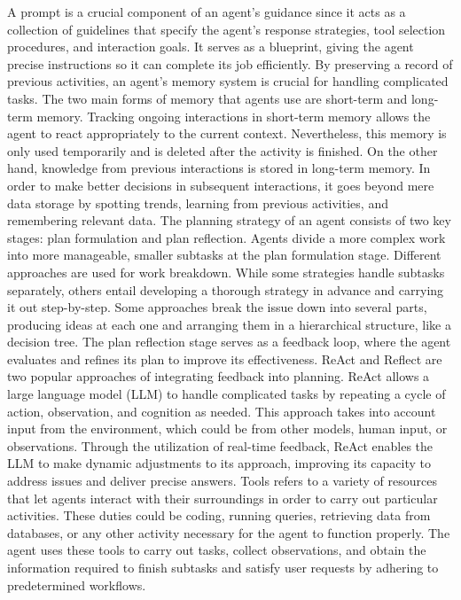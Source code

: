     A prompt is a crucial component of an agent's guidance since it acts as a collection of guidelines that specify the agent's response strategies, tool selection procedures, and interaction goals. It serves as a blueprint, giving the agent precise instructions so it can complete its job efficiently. By preserving a record of previous activities, an agent's memory system is crucial for handling complicated tasks. The two main forms of memory that agents use are short-term and long-term memory. Tracking ongoing interactions in short-term memory allows the agent to react appropriately to the current context. Nevertheless, this memory is only used temporarily and is deleted after the activity is finished. On the other hand, knowledge from previous interactions is stored in long-term memory. In order to make better decisions in subsequent interactions, it goes beyond mere data storage by spotting trends, learning from previous activities, and remembering relevant data. The planning strategy of an agent consists of two key stages: plan formulation and plan reflection. Agents divide a more complex work into more manageable, smaller subtasks at the plan formulation stage. Different approaches are used for work breakdown. While some strategies handle subtasks separately, others entail developing a thorough strategy in advance and carrying it out step-by-step. Some approaches break the issue down into several parts, producing ideas at each one and arranging them in a hierarchical structure, like a decision tree. The plan reflection stage serves as a feedback loop, where the agent evaluates and refines its plan to improve its effectiveness. ReAct and Reflect are two popular approaches of integrating feedback into planning. ReAct allows a large language model (LLM) to handle complicated tasks by repeating a cycle of action, observation, and cognition as needed. This approach takes into account input from the environment, which could be from other models, human input, or observations. Through the utilization of real-time feedback, ReAct enables the LLM to make dynamic adjustments to its approach, improving its capacity to address issues and deliver precise answers. Tools refers to a variety of resources that let agents interact with their surroundings in order to carry out particular activities. These duties could be coding, running queries, retrieving data from databases, or any other activity necessary for the agent to function properly. The agent uses these tools to carry out tasks, collect observations, and obtain the information required to finish subtasks and satisfy user requests by adhering to predetermined workflows.
